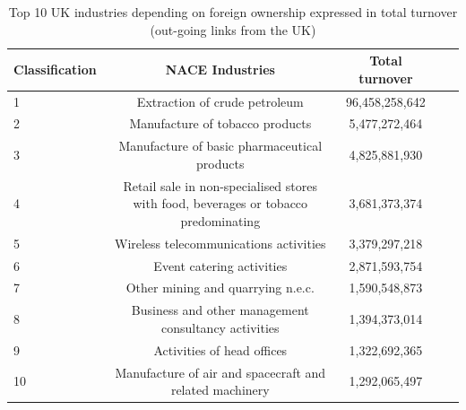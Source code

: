 \documentclass[10pt,letterpaper]{article}
\begin{document}
\FloatBarrier

\begin{table}[!ht]
\begin{adjustwidth}{-2.25in}{0in}
\caption{Top 10 UK industries depending on foreign ownership expressed in total turnover (out-going links from the UK)\label{tab:uk_outgoing}}
\centering
\medskip
\begin{tabular}{|l|c|c|c|c|}
\hline
Classification  & NACE Industries & Total turnover \\ 
\hline
1 &     Extraction of crude petroleum &   96,458,258,642  \\
\hline
2 & Manufacture of tobacco products &  5,477,272,464  \\
\hline
3 & Manufacture of basic pharmaceutical products &  4,825,881,930 \\
\hline
4 &  Retail sale in non-specialised stores with food, beverages or tobacco predominating  &   3,681,373,374  \\
\hline
5 &  Wireless telecommunications activities &   3,379,297,218  \\
\hline
6 & Event catering activities & 2,871,593,754  \\
\hline
7 &  Other mining and quarrying n.e.c. &  1,590,548,873  \\
\hline
8 & Business and other management consultancy activities &  1,394,373,014 \\
\hline
9 &  Activities of head offices &  1,322,692,365 \\
\hline
10 & Manufacture of air and spacecraft and related machinery &  1,292,065,497 \\
\hline
\end{tabular}
\end{adjustwidth}
\end{table}
\end{document}
